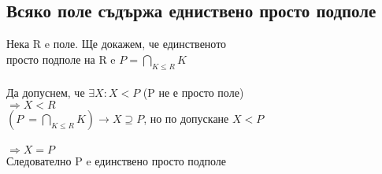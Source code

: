 \documentclass[12pt]{article}
\begin{document}
\subsection{Всяко поле съдържа едниствено просто подполе}

Нека R e поле. Ще докажем, че единственото\\
просто подполе на R e $P = \bigcap\limits_{K \leq R} K$ \\\\
Да допуснем, че $\exists X : X < P$ (P не е просто поле) \\
$\Rightarrow X < R$ \\
$(P \ = \bigcap\limits_{K \leq R} K ) \rightarrow X \supseteq P$, но по допускане $X < P$\\\\
$\Rightarrow X=P$ \\
Следователно P e единствено просто подполе
\end{document}

